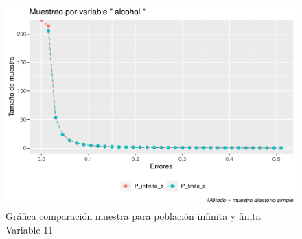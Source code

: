 \documentclass[
]{article}
\begin{document}
\begin{figure}
\centering
\includegraphics{1_examen_solucion_files/figure-latex/grafica va11-1.pdf}
\caption{Gráfica comparación muestra para población infinita y finita
Variable 11}
\end{figure}
\end{document}
